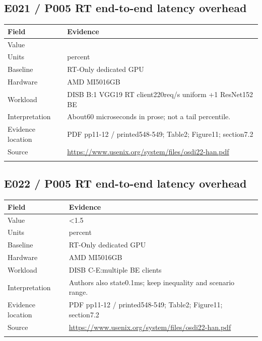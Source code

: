 \subsection*{E021 / P005 RT end-to-end latency overhead}

\begin{longtable}{>{\raggedright\arraybackslash}p{}>{\raggedright\arraybackslash}p{}}
\toprule
\textbf{Field} & \textbf{Evidence}\\\midrule\endhead
Value & 1\\\addlinespace
Units & percent\\\addlinespace
Baseline & RT-Only dedicated GPU\\\addlinespace
Hardware & AMD MI5016GB\\\addlinespace
Workload & DISB B:1 VGG19 RT client220req/s uniform +1 ResNet152 BE\\\addlinespace
Interpretation & About60 microseconds in prose; not a tail percentile.\\\addlinespace
Evidence location & PDF pp11-12 / printed548-549; Table2; Figure11; section7.2\\\addlinespace
Source & \url{https://www.usenix.org/system/files/osdi22-han.pdf}\\\addlinespace
\bottomrule\end{longtable}

\subsection*{E022 / P005 RT end-to-end latency overhead}

\begin{longtable}{>{\raggedright\arraybackslash}p{}>{\raggedright\arraybackslash}p{}}
\toprule
\textbf{Field} & \textbf{Evidence}\\\midrule\endhead
Value & <1.5\\\addlinespace
Units & percent\\\addlinespace
Baseline & RT-Only dedicated GPU\\\addlinespace
Hardware & AMD MI5016GB\\\addlinespace
Workload & DISB C-E:multiple BE clients\\\addlinespace
Interpretation & Authors also state0.1ms; keep inequality and scenario range.\\\addlinespace
Evidence location & PDF pp11-12 / printed548-549; Table2; Figure11; section7.2\\\addlinespace
Source & \url{https://www.usenix.org/system/files/osdi22-han.pdf}\\\addlinespace
\bottomrule\end{longtable}

